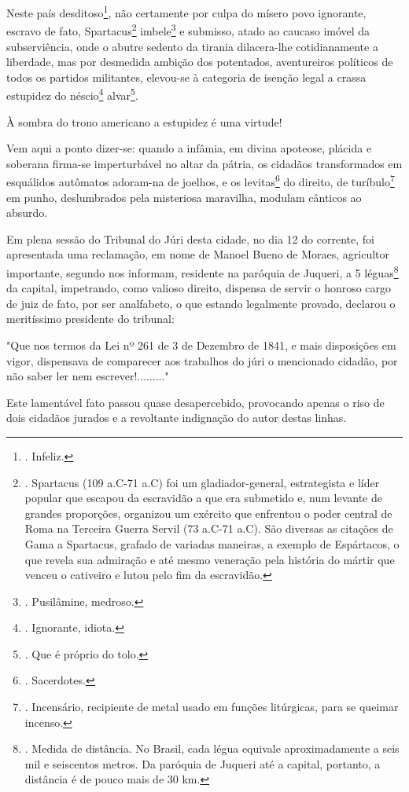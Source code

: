 Neste país desditoso\footnote{. Infeliz.}, não certamente por culpa do
mísero povo ignorante, escravo de fato, Spartacus\footnote{. Spartacus
  (109 a.C-71 a.C) foi um gladiador-general, estrategista e líder
  popular que escapou da escravidão a que era submetido e, num levante
  de grandes proporções, organizou um exército que enfrentou o poder
  central de Roma na Terceira Guerra Servil (73 a.C-71 a.C). São
  diversas as citações de Gama a Spartacus, grafado de variadas
  maneiras, a exemplo de Espártacos, o que revela sua admiração e até
  mesmo veneração pela história do mártir que venceu o cativeiro e lutou
  pelo fim da escravidão.} imbele\footnote{. Pusilâmine, medroso.} e
submisso, atado ao caucaso imóvel da subserviência, onde o abutre
sedento da tirania dilacera-lhe cotidianamente a liberdade, mas por
desmedida ambição dos potentados, aventureiros políticos de todos os
partidos militantes, elevou-se à categoria de isenção legal a crassa
estupidez do néscio\footnote{. Ignorante, idiota.} alvar\footnote{. Que
  é próprio do tolo.}.

À sombra do trono americano a estupidez é uma virtude!

Vem aqui a ponto dizer-se: quando a infâmia, em divina apoteose, plácida
e soberana firma-se imperturbável no altar da pátria, os cidadãos
transformados em esquálidos autômatos adoram-na de joelhos, e os
levitas\footnote{. Sacerdotes.} do direito, de turíbulo\footnote{.
  Incensário, recipiente de metal usado em funções litúrgicas, para se
  queimar incenso.} em punho, deslumbrados pela misteriosa maravilha,
modulam cânticos ao absurdo.

Em plena sessão do Tribunal do Júri desta cidade, no dia 12 do corrente,
foi apresentada uma reclamação, em nome de Manoel Bueno de Moraes,
agricultor importante, segundo nos informam, residente na paróquia de
Juqueri, a 5 léguas\footnote{. Medida de distância. No Brasil, cada
  légua equivale aproximadamente a seis mil e seiscentos metros. Da
  paróquia de Juqueri até a capital, portanto, a distância é de pouco
  mais de 30 km.} da capital, impetrando, como valioso direito, dispensa
de servir o honroso cargo de juiz de fato, por ser analfabeto, o que
estando legalmente provado, declarou o meritíssimo presidente do
tribunal:

"Que nos termos da Lei nº 261 de 3 de Dezembro de 1841, e mais
disposições em vigor, dispensava de comparecer aos trabalhos do júri o
mencionado cidadão, por não saber ler nem escrever!........."

Este lamentável fato passou quase desapercebido, provocando apenas o
riso de dois cidadãos jurados e a revoltante indignação do autor destas
linhas.

